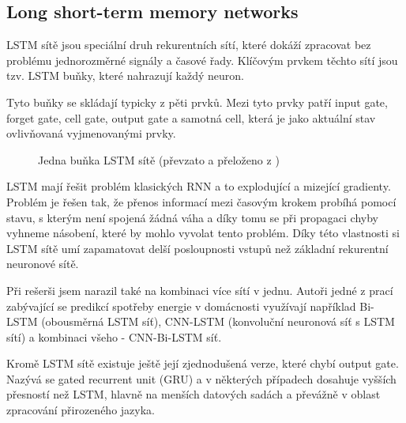 \documentclass[FM,BP,fonts]{tulthesis}
\begin{document}
\subsection{Long short-term memory networks}\label{nn-lstm}
LSTM sítě jsou speciální druh rekurentních sítí, které dokáží zpracovat  bez problému jednorozměrné signály a časové řady. Klíčovým prvkem těchto sítí jsou tzv. LSTM buňky, které nahrazují každý neuron. 

Tyto buňky se skládají typicky z pěti prvků. Mezi tyto prvky patří input gate, forget gate, cell gate, output gate a samotná cell, která je jako aktuální stav ovlivňovaná vyjmenovanými prvky.

\begin{figure}[htbp]
	\centering
	\caption{Jedna buňka LSTM sítě (převzato a přeloženo z \cite{colah})}
	\label{fig:my_graph}
\end{figure}

LSTM mají řešit problém klasických RNN a to explodující a mizející gradienty. Problém je řešen tak, že přenos informací mezi časovým krokem probíhá pomocí stavu, s kterým není spojená žádná váha a díky tomu se při propagaci chyby vyhneme násobení, které by mohlo vyvolat tento problém. Díky této vlastnosti si LSTM sítě umí zapamatovat delší posloupnosti vstupů než základní rekurentní neuronové sítě.

Při rešerši jsem narazil také na kombinaci více sítí v jednu. Autoři jedné z prací zabývající se predikcí spotřeby energie v domácnosti \cite{cnn-bi-lstm}	 využívají například Bi-LSTM (obousměrná LSTM síť), CNN-LSTM (konvoluční neuronová síť s LSTM sítí) a kombinaci všeho - CNN-Bi-LSTM síť.

Kromě LSTM sítě existuje ještě její zjednodušená verze, které chybí output gate. Nazývá se gated recurrent unit (GRU) a v některých případech dosahuje vyšších přesností než LSTM, hlavně na menších datových sadách a převážně v oblast zpracování přirozeného jazyka. \cite{kynych2018vyuziti}
\end{document}
